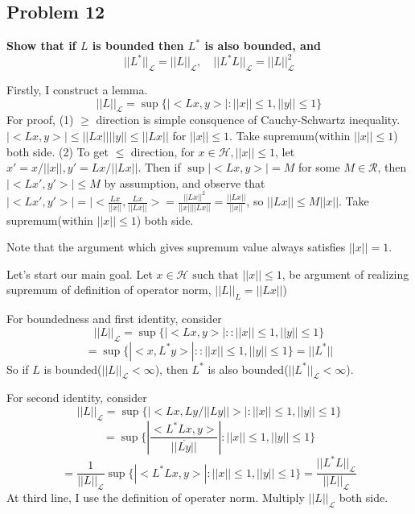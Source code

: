 \documentclass{article}
\begin{document}
\subsection{Problem 12}
\textbf{
    Show that if $L$ is bounded then $L^*$ is also bounded, and
    \[||L^*||_{\mathcal{L}}=||L||_{\mathcal{L}}, \quad  
    ||L^*L||_{\mathcal{L}}=||L||^2_{\mathcal{L}}
    \]
}

Firstly, I construct a lemma.
\[||L||_{\mathcal{L}} = \sup\{|<Lx,y>|:||x||\leq 1, ||y||\leq 1\}\]
For proof, (1) $\geq$ direction is simple consquence of Cauchy-Schwartz inequality.
\(|<Lx,y>|\leq ||Lx||||y|| \leq ||Lx||\) for $||x||\leq 1$. Take supremum(within $||x||\leq 1$) both side.
(2) To get $\leq$ direction, for $x\in \mathcal{H}, ||x||\leq 1$,
let $x'=x/||x||, y'=Lx/||Lx||$. Then if $\sup|<Lx,y>|= M$ for some $M\in\mathcal{R}$, then $|<Lx',y'>|\leq M$ by assumption, and observe that
\(|<Lx',y'>|=|<\frac{Lx}{||x||},\frac{Lx}{||Lx||}>=\frac{||Lx||^2}{||x||||Lx||}=\frac{||Lx||}{||x||}\), so
$||Lx||\leq M||x||$. Take supremum(within $||x||\leq 1$) both side.

Note that the argument which gives supremum value always satisfies $||x||=1$.

Let's start our main goal.
Let $x\in \mathcal{H} \text{ such that } ||x||\leq 1$, be argument of realizing supremum of definition of operator norm, \(||L||_{L}=||Lx||\))

For boundedness and first identity, consider
\[||L||_\mathcal{{L}}=\sup\{|<Lx, y>| : :||x||\leq 1, ||y||\leq 1\}\]
\[=\sup\{|<x, L^*y>| : :||x||\leq 1, ||y||\leq 1\} = ||L^*||\]
So if $L$ is bounded($||L||_\mathcal{L}<\infty$), then $L^*$ is also bounded($||L^*||_\mathcal{L}<\infty$).

For second identity, consider
\[||L||_\mathcal{{L}}=\sup\{|<Lx, Ly/||Ly||>| :||x||\leq 1, ||y||\leq 1\}\]
\[=\sup\{|\frac{<L^*Lx, y>}{\overline{||Ly||}}| : ||x||\leq 1, ||y||\leq 1\}\]
\[=\frac{1}{||L||_{\mathcal{L}}}\sup\{|<L^*Lx, y>| : ||x||\leq 1, ||y||\leq 1\}=\frac{||L^*L||_{\mathcal{L}}}{||L||_{\mathcal{L}}}\]
At third line, I use the definition of operater norm. Multiply $||L||_{\mathcal{L}}$ both side.
\end{document}
